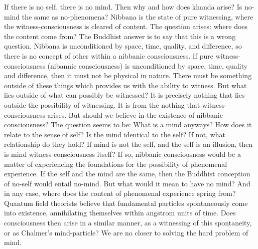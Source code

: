 \documentclass[leqno]{article}
\begin{document}
	If there is no self, there is no mind. Then why and how does khanda arise? Is
	no-mind the same as no-phenomena? Nibbana is the state of pure witnessing,
	where the witness-consciousness is cleared of content. The question arises:
	where does the content come from? The Buddhist answer is to say that this is a
	wrong question. Nibbana is unconditioned by space, time, quality, and difference,
	so there is no concept of other within a nibbanic consciousness. If pure witness-consciousness
	(nibannic consciousness) is unconditioned by space, time, quality and difference,
	then it must not be physical in nature. There must be something outside of these
	things which provides us with the ability to witness. But what lies outside of
	what can possibly be witnessed? It is precisely nothing that lies outside the possibility
	of witnessing. It is from the nothing that witness-consciousness arises. But should
	we believe in the existence of nibbanic consciousness? The question seems to
	be: What is a mind anyways? How does it relate to the sense of self? Is the mind
	identical to the self? If not, what relationship do they hold? If mind is not
	the self, and the self is an illusion, then is mind witness-consciousness
	itself? If so, nibbanic consciousness would be a matter of experiencing the
	foundations for the possibility of phenomenal experience. If the self and the mind
	are the same, then the Buddhist conception of no-self would entail no-mind. But
	what would it mean to have no mind? And in any case, where does the content of
	phenomenal experience spring from? Quantum field theorists believe that
	fundamental particles spontaneously come into existence, annihilating themselves
	within angstrom units of time. Does consciousness then arise in a similar
	manner, as a witnessing of this spontaneity, or as Chalmer’s mind-particle? We
	are no closer to solving the hard problem of mind.

	\printbibliography
\end{document}
